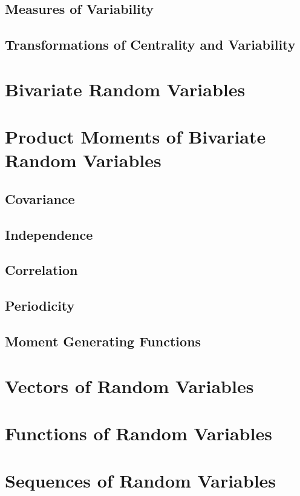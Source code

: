 \documentclass{article}
\begin{document}
\subsection{Measures of Variability}
\subsection{Transformations of Centrality and Variability}

\newpage
\section{Bivariate Random Variables}

\section {Product Moments of Bivariate Random Variables}
\subsection{Covariance}
\subsection{Independence}
\subsection{Correlation}
\subsection{Periodicity}
\subsection{Moment Generating Functions}

\section{Vectors of Random Variables}

\newpage
\section{Functions of Random Variables}

\newpage
\section{Sequences of Random Variables}
\end{document}
